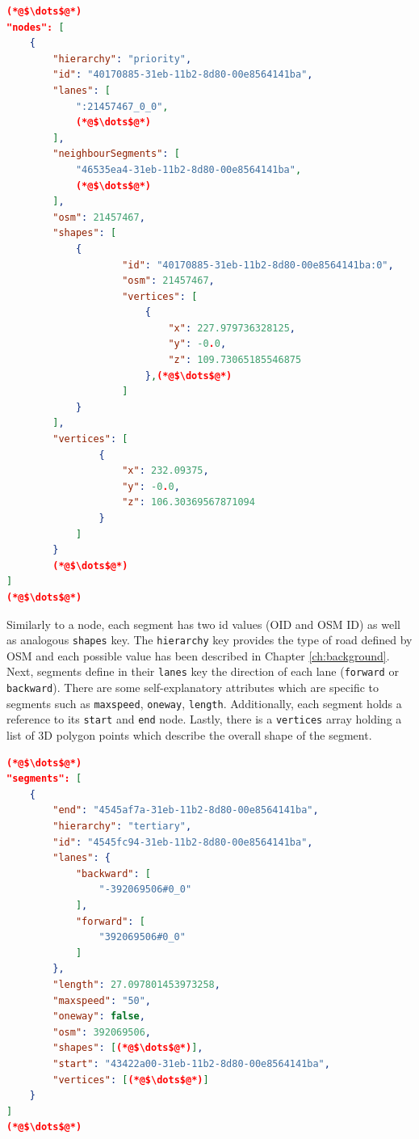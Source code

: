     \begin{scriptsize}
        \begin{lstlisting}[language=json,firstnumber=1,caption={General overview of the node key in the JSON exportformat.},label={lis:format-node}]
(*@$\dots$@*)
"nodes": [
    {
        "hierarchy": "priority",
        "id": "40170885-31eb-11b2-8d80-00e8564141ba",
        "lanes": [
            ":21457467_0_0",
            (*@$\dots$@*)
        ],
        "neighbourSegments": [
            "46535ea4-31eb-11b2-8d80-00e8564141ba",
            (*@$\dots$@*)
        ],
        "osm": 21457467,
        "shapes": [
            {
                    "id": "40170885-31eb-11b2-8d80-00e8564141ba:0",
                    "osm": 21457467,
                    "vertices": [
                        {
                            "x": 227.979736328125,
                            "y": -0.0,
                            "z": 109.73065185546875
                        },(*@$\dots$@*)
                    ]
            }
        ],
        "vertices": [
                {
                    "x": 232.09375,
                    "y": -0.0,
                    "z": 106.30369567871094
                }
            ]
        }
        (*@$\dots$@*)
]
(*@$\dots$@*)
	   \end{lstlisting}
    \end{scriptsize}
    
Similarly to a node, each segment has two id values (OID and OSM ID) as well as analogous \texttt{shapes} key. The \texttt{hierarchy} key provides the type of road defined by OSM and each possible value has been described in Chapter \ref{ch:background}. Next, segments define in their \texttt{lanes} key the direction of each lane (\texttt{forward} or \texttt{backward}). There are some self-explanatory attributes which are specific to segments such as \texttt{maxspeed}, \texttt{oneway}, \texttt{length}. Additionally, each segment holds a reference to its \texttt{start} and \texttt{end} node. Lastly, there is a \texttt{vertices} array holding a list of 3D polygon points which describe the overall shape of the segment.\\

\begin{scriptsize}
        \begin{lstlisting}[language=json,firstnumber=1,caption={General overview of the segments key in the JSON export format.},label={lis:format-lanes}]
(*@$\dots$@*)
"segments": [
    {
        "end": "4545af7a-31eb-11b2-8d80-00e8564141ba",
        "hierarchy": "tertiary",
        "id": "4545fc94-31eb-11b2-8d80-00e8564141ba",
        "lanes": {
            "backward": [
                "-392069506#0_0"
            ],
            "forward": [
                "392069506#0_0"
            ]
        },
        "length": 27.097801453973258,
        "maxspeed": "50",
        "oneway": false,
        "osm": 392069506,
        "shapes": [(*@$\dots$@*)],
        "start": "43422a00-31eb-11b2-8d80-00e8564141ba",
        "vertices": [(*@$\dots$@*)]
    }
]           
(*@$\dots$@*)
	   \end{lstlisting}
    \end{scriptsize}


